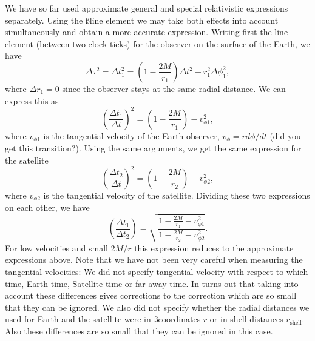 {\begin{multicols}{2}
We have so far used approximate general and special relativistic expressions separately. Using the \ss line element we may take both effects into account simultaneously and obtain a more accurate expression. Writing first the line element (between two clock ticks) for the observer on the surface of the Earth, we have
\[
\Delta\tau^2=\Delta t_1^2=\left(1-\frac{2M}{r_1}\right)\Delta t^2-r_1^2\Delta\phi_1^2,
\]
where $\Delta r_1=0$ since the observer stays at the same radial distance. We can express this as
\[
\left(\frac{\Delta t_1}{\Delta t}\right)^2=\left(1-\frac{2M}{r_1}\right)-v_{\phi1}^2,
\]
where $v_{\phi1}$ is the tangential velocity of the Earth observer, $v_\phi=rd\phi/dt$ (did you get this transition?). Using the same arguments, we get the same expression for the satellite
\[
\left(\frac{\Delta t_2}{\Delta t}\right)^2=\left(1-\frac{2M}{r_2}\right)-v_{\phi2}^2,
\]
where $v_{\phi2}$ is the tangential velocity of the satellite. Dividing these two expressions on each other, we have
\[
\left(\frac{\Delta t_1}{\Delta t_2}\right)=\sqrt{\frac{1-\frac{2M}{r_1}-v_{\phi1}^2}{1-\frac{2M}{r_2}-v_{\phi2}^2}}.
\]
For low velocities and small $2M/r$ this expression reduces to the approximate expressions above. Note that we have not been very careful when measuring the tangential velocities: We did not specify tangential velocity with respect to which time, Earth time, Satellite time or far-away time. In turns out that taking into account these differences gives corrections to the correction which are so small that they can be ignored. We also did not specify whether the radial distances we used for Earth and the satellite were in \ss coordinates $r$ or in shell distances $r_\mathrm{shell}$. Also these differences are so small that they can be ignored in this case.






\end{multicols}}
